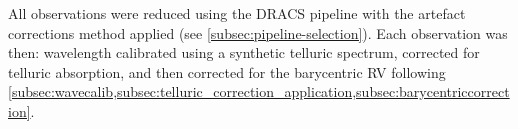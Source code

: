 All observations were reduced using the {DRACS} pipeline with the artefact corrections method applied (see \cref{subsec:pipeline-selection}).
Each observation was then: wavelength calibrated using a synthetic telluric spectrum, corrected for telluric absorption, and then corrected for the barycentric {RV} following  \cref{subsec:wavecalib,subsec:telluric_correction_application,subsec:barycentriccorrection}.

